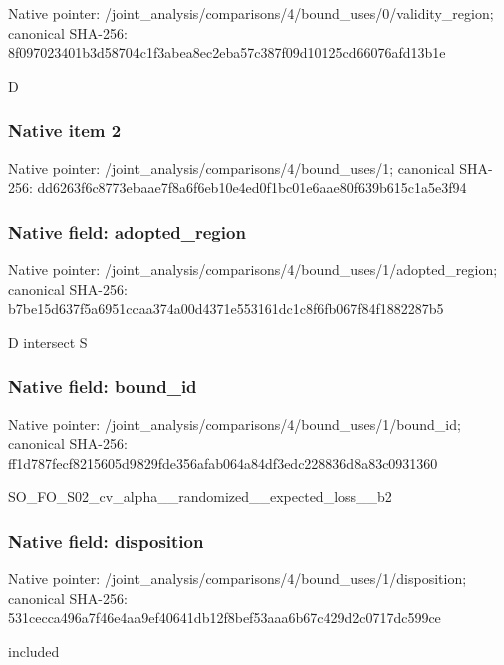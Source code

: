 \documentclass[10pt,a4paper]{article}
\begin{document}
Native pointer: /joint\_analysis/comparis\allowbreak{}ons/4/bound\_uses/0/valid\allowbreak{}ity\_region; canonical SHA-256: 8f097023401b3d58704c1f3a\allowbreak{}bea8ec2eba57c387f09d1012\allowbreak{}5cd66076afd13b1e


D


\subsubsection{Native item 2}


Native pointer: /joint\_analysis/comparis\allowbreak{}ons/4/bound\_uses/1; canonical SHA-256: dd6263f6c8773ebaae7f8a6f\allowbreak{}6eb10e4ed0f1bc01e6aae80f\allowbreak{}639b615c1a5e3f94



\subsubsection{Native field: adopted\_region}


Native pointer: /joint\_analysis/comparis\allowbreak{}ons/4/bound\_uses/1/adopt\allowbreak{}ed\_region; canonical SHA-256: b7be15d637f5a6951ccaa374\allowbreak{}a00d4371e553161dc1c8f6fb\allowbreak{}067f84f1882287b5


D intersect S


\subsubsection{Native field: bound\_id}


Native pointer: /joint\_analysis/comparis\allowbreak{}ons/4/bound\_uses/1/bound\allowbreak{}\_id; canonical SHA-256: ff1d787fecf8215605d9829f\allowbreak{}de356afab064a84df3edc228\allowbreak{}836d8a83c0931360


SO\_FO\_S02\_cv\_alpha\_\_rand\allowbreak{}omized\_\_expected\_loss\_\_b\allowbreak{}2


\subsubsection{Native field: disposition}


Native pointer: /joint\_analysis/comparis\allowbreak{}ons/4/bound\_uses/1/dispo\allowbreak{}sition; canonical SHA-256: 531cecca496a7f46e4aa9ef4\allowbreak{}0641db12f8bef53aaa6b67c4\allowbreak{}29d2c0717dc599ce


included
\end{document}
